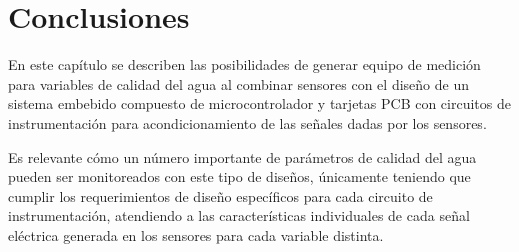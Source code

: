 \section{Conclusiones}

En este capítulo se describen las posibilidades de generar equipo de medición para variables de calidad del agua al combinar sensores con el diseño de un sistema embebido compuesto de microcontrolador y tarjetas PCB con 
circuitos de instrumentación para acondicionamiento de las señales dadas por los sensores.

Es relevante cómo un número importante de parámetros de calidad del agua pueden ser monitoreados con este tipo de diseños, únicamente teniendo que cumplir los requerimientos de diseño específicos para cada circuito de 
instrumentación, atendiendo a las características individuales de cada señal eléctrica generada en los sensores para cada variable distinta.
